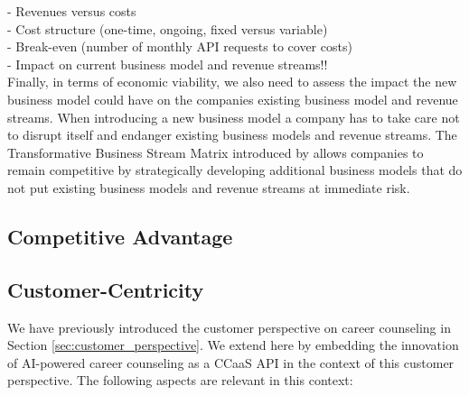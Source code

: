 - Revenues versus costs \\
- Cost structure (one-time, ongoing, fixed versus variable) \\
- Break-even (number of monthly API requests to cover costs) \\
- Impact on current business model and revenue streams!! \\

Finally, in terms of economic viability, we also need to assess the impact the new business model could 
have on the companies existing business model and revenue streams. When introducing a new business model 
a company has to take care not to disrupt itself and endanger existing business models and revenue streams.
The Transformative Business Stream Matrix introduced by \citet{schwafertsTransformativeBusinessStream2016}
allows companies to remain competitive by strategically developing additional business models that do not
put existing business models and revenue streams at immediate risk.

\subsection{Competitive Advantage}


\subsection{Customer-Centricity}

We have previously introduced the customer perspective on career counseling in Section \ref{sec:customer_perspective}.
We extend here by embedding the innovation of AI-powered career counseling as a CCaaS API in the context of this 
customer perspective. The following aspects are relevant in this context:

